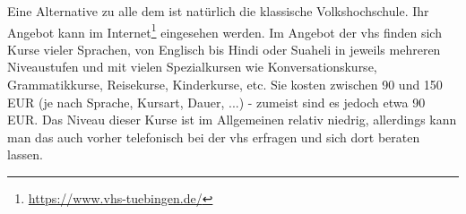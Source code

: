 Eine Alternative zu alle dem ist natürlich die klassische Volkshochschule.  Ihr Angebot kann
  im Internet\footnote{\url{https://www.vhs-tuebingen.de/}} eingesehen
  werden.  Im Angebot der vhs finden sich Kurse vieler Sprachen, von Englisch bis Hindi oder Suaheli in jeweils mehreren Niveaustufen und mit vielen
  Spezialkursen wie Konversationskurse, Grammatikkurse, Reisekurse,
  Kinderkurse, etc.  Sie kosten zwischen 90 und 150 EUR (je nach
  Sprache, Kursart, Dauer, ...) - zumeist sind es jedoch etwa 90 EUR.  Das Niveau dieser Kurse ist
  im Allgemeinen relativ niedrig, allerdings kann man das
  auch vorher telefonisch bei der vhs erfragen und sich dort beraten
  lassen.
